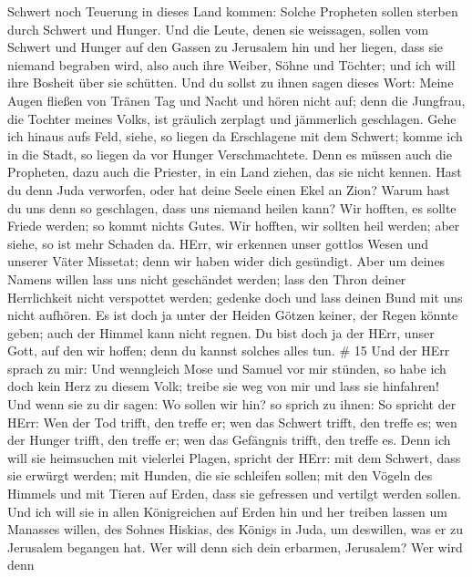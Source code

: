 Schwert noch Teuerung in dieses Land kommen: Solche Propheten sollen
sterben durch Schwert und Hunger.  Und die Leute, denen sie
weissagen, sollen vom Schwert und Hunger auf den Gassen zu Jerusalem hin
und her liegen, dass sie niemand begraben wird, also auch ihre Weiber,
Söhne und Töchter; und ich will ihre Bosheit über sie schütten.
 Und du sollst zu ihnen sagen dieses Wort: Meine Augen
fließen von Tränen Tag und Nacht und hören nicht auf; denn die Jungfrau,
die Tochter meines Volks, ist gräulich zerplagt und jämmerlich
geschlagen.  Gehe ich hinaus aufs Feld, siehe, so liegen da
Erschlagene mit dem Schwert; komme ich in die Stadt, so liegen da vor
Hunger Verschmachtete. Denn es müssen auch die Propheten, dazu auch die
Priester, in ein Land ziehen, das sie nicht kennen.  Hast
du denn Juda verworfen, oder hat deine Seele einen Ekel an Zion? Warum
hast du uns denn so geschlagen, dass uns niemand heilen kann? Wir
hofften, es sollte Friede werden; so kommt nichts Gutes. Wir hofften,
wir sollten heil werden; aber siehe, so ist mehr Schaden da.
 HErr, wir erkennen unser gottlos Wesen und unserer Väter
Missetat; denn wir haben wider dich gesündigt.  Aber um
deines Namens willen lass uns nicht geschändet werden; lass den Thron
deiner Herrlichkeit nicht verspottet werden; gedenke doch und lass
deinen Bund mit uns nicht aufhören.  Es ist doch ja unter
der Heiden Götzen keiner, der Regen könnte geben; auch der Himmel kann
nicht regnen. Du bist doch ja der HErr, unser Gott, auf den wir hoffen;
denn du kannst solches alles tun. \# 15  Und der HErr sprach
zu mir: Und wenngleich Mose und Samuel vor mir stünden, so habe ich doch
kein Herz zu diesem Volk; treibe sie weg von mir und lass sie hinfahren!
 Und wenn sie zu dir sagen: Wo sollen wir hin? so sprich zu
ihnen: So spricht der HErr: Wen der Tod trifft, den treffe er; wen das
Schwert trifft, den treffe es; wen der Hunger trifft, den treffe er; wen
das Gefängnis trifft, den treffe es.  Denn ich will sie
heimsuchen mit vielerlei Plagen, spricht der HErr: mit dem Schwert, dass
sie erwürgt werden; mit Hunden, die sie schleifen sollen; mit den Vögeln
des Himmels und mit Tieren auf Erden, dass sie gefressen und vertilgt
werden sollen.  Und ich will sie in allen Königreichen auf
Erden hin und her treiben lassen um Manasses willen, des Sohnes Hiskias,
des Königs in Juda, um deswillen, was er zu Jerusalem begangen hat.
 Wer will denn sich dein erbarmen, Jerusalem? Wer wird denn

